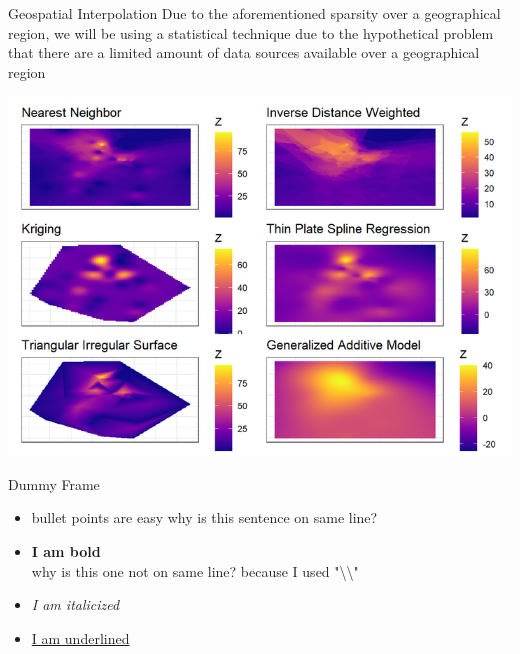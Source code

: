 \documentclass{beamer}
\begin{document}
\begin{frame}{Geospatial Interpolation}
Due to the aforementioned sparsity over a geographical region,
we will be using a statistical technique due to the hypothetical problem that there are a limited amount of data sources available over a geographical region
\begin{center}
    \includegraphics[width=0.65\linewidth]{figures/geostats.png} \\
\end{center}
\end{frame}

\begin{frame}{Dummy Frame}
\begin{itemize}
    \item bullet points are easy
    why is this sentence on same line? 
    \item \textbf{I am bold} \\
    why is this one not on same line? because I used "\textbackslash \textbackslash"
    \item \textit{I am italicized}
    \item \underline{I am underlined}
\end{itemize}
\end{frame}
\end{document}
